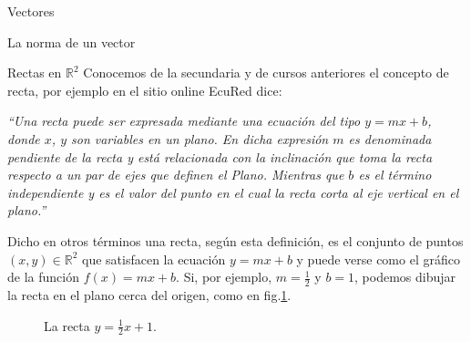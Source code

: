 \documentclass[a4paper,12pt,twoside,spanish,reqno]{amsbook}
\theoremstyle{definition}
\theoremstyle{remark}
\newcommand{\R}{\mathbb R}
\begin{document}
\begin{chapter}{Vectores}
\begin{section}{La norma de un vector}
    \end{section}

    \begin{section}{Rectas en $\R^2$}\label{seccion-rectas-en-r2}
    Conocemos de la secundaria y de cursos anteriores el concepto de recta, por ejemplo en el  sitio online EcuRed dice: 
    
    \textit{``Una recta puede ser expresada mediante una ecuación del tipo $y = m x + b$, donde $x$, $y$ son variables en un plano. En dicha expresión $m$ es denominada pendiente de la recta y está relacionada con la inclinación que toma la recta respecto a un par de ejes que definen el Plano. Mientras que $b$ es el término independiente y es el valor del punto en el cual la recta corta al eje vertical en el plano.''}
    
    Dicho en otros términos una recta,  según esta definición, es el conjunto de puntos $(x,y) \in \R^2$ que satisfacen la ecuación $y = m x + b$ y puede verse como el gráfico de la función $f(x) = m x + b$. Si, por ejemplo, $m=\frac12$ y $b=1$, podemos dibujar la recta en el plano cerca del origen, como en fig.\ref{fig-recta-funcion}.
    \begin{figure}[h]
        \caption{La recta $y = \frac12x +1$.}
        \label{fig-recta-funcion}
    \end{figure} 
    

\end{section}
\end{chapter}
\end{document}
